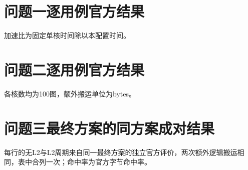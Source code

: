 
\section{问题一逐用例官方结果}
加速比为固定单核时间除以本配置时间。

\section{问题二逐用例官方结果}
各核数均为100图，额外搬运单位为bytes。

\section{问题三最终方案的同方案成对结果}
每行的无L2与L2周期来自同一最终方案的独立官方评价，两次额外逻辑搬运相同，表中合列一次；命中率为官方字节命中率。

